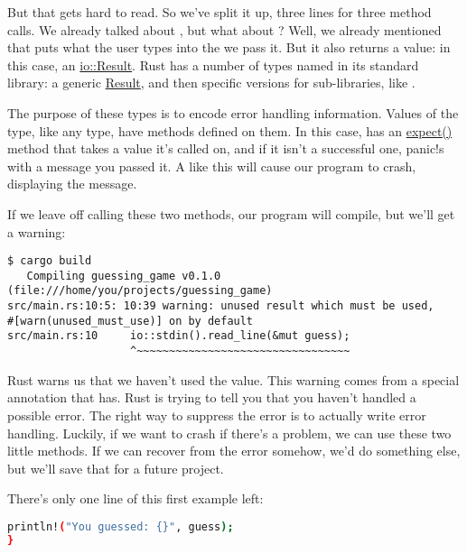 But that gets hard to read. So we’ve split it up, three lines for three method calls. We already talked about ,
but what about ? Well, we already mentioned that  puts what the user types into the 
 we pass it. But it also returns a value: in this case, an 
\href{https://doc.rust-lang.org/std/io/type.Result.html}{io::Result}. Rust has a number of types named  in its 
standard library: a generic \href{https://doc.rust-lang.org/std/result/enum.Result.html}{Result}, and then specific versions 
for sub-libraries, like .

\blank

The purpose of these  types is to encode error handling information. Values of the  type, like any 
type, have methods defined on them. In this case,  has an 
\href{https://doc.rust-lang.org/std/option/enum.Option.html\#method.expect}{expect()} method that takes a value it’s called on, 
and if it isn’t a successful one, panic!s with a message you passed it. A  like this will cause our program to crash,
displaying the message.

\blank

If we leave off calling these two methods, our program will compile, but we’ll get a warning:

\begin{verbatim}
$ cargo build
   Compiling guessing_game v0.1.0 (file:///home/you/projects/guessing_game)
src/main.rs:10:5: 10:39 warning: unused result which must be used,
#[warn(unused_must_use)] on by default
src/main.rs:10     io::stdin().read_line(&mut guess);
                   ^~~~~~~~~~~~~~~~~~~~~~~~~~~~~~~~~~
\end{verbatim}

Rust warns us that we haven’t used the  value. This warning comes from a special annotation that 
 has. Rust is trying to tell you that you haven’t handled a possible error. The right way to suppress 
the error is to actually write error handling. Luckily, if we want to crash if there’s a problem, we can use these two 
little methods. If we can recover from the error somehow, we’d do something else, but we’ll save that for a future project.

\blank

There’s only one line of this first example left:

\begin{lstlisting}[language=Bash]
    println!("You guessed: {}", guess);
} 
\end{lstlisting}

